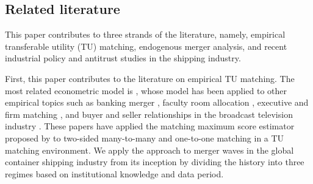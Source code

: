 \documentclass[10pt]{article}
\begin{document}
{\subsection{Related literature}

This paper contributes to three strands of the literature, namely, empirical transferable utility (TU) matching, endogenous merger analysis, and recent industrial policy and antitrust studies in the shipping industry.

First, this paper contributes to the literature on empirical TU matching. 
The most related econometric model is \cite{fox2018qe}, whose model has been applied to other empirical topics such as banking merger \citep{akkus2015ms,chen2013ijio}, faculty room allocation \citep{baccara2012aer}, executive and firm matching \citep{pan2017determinants}, and buyer and seller relationships in the broadcast television industry \citep{stahl2016aer}. 
These papers have applied the matching maximum score estimator proposed by \cite{fox2010qe,fox2018qe} to two-sided many-to-many and one-to-one matching in a TU matching environment. 
We apply the approach to merger waves in the global container shipping industry from its inception by dividing the history into three regimes based on institutional knowledge and data period.

}
\end{document}
